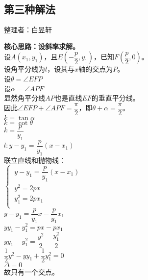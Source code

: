 \documentclass[UTF8]{ctexart}
\begin{document}
\subsection{第三种解法}
    \begin{center}
        整理者：白昱轩
    \end{center}
    \begin{multicols}{2}
        \small
        \textbf{核心思路：设斜率求解。}\\[5mm]
        设$A(x_1,y_1)$，且$E\left(-\dfrac{p}{2},y_1\right)$，已知$F\left(\dfrac{p}{2},0\right)$。\\[5mm]
        设角平分线为$l$，设其与$x$轴的交点为$P$。\\[5mm]
        设$\theta=\angle EFP$\\[5mm]
        设$\alpha=\angle APF$\\[5mm]
        显然角平分线$AP$也是直线$EF$的垂直平分线。\\[5mm]
        因此$\angle EFP + \angle APF=\dfrac{\pi}{2}$，即$\theta+\alpha=\dfrac{\pi}{2}$。\\[5mm]
        $k=\tan\alpha$\\[5mm]
        $k=\cot\theta$\\[5mm]
        $k=\dfrac{p}{y_1}$\\[5mm]
        $l:y-y_1=\dfrac{p}{y_1}\left(x-x_1\right)$\\[5mm]
        联立直线和抛物线：\\[5mm]
        \begin{math}
            \begin{cases}
                ~y-y_1 = \dfrac{p}{y_1}\left(x-x_1\right)\\[1mm]
                ~y^2 = 2px\\[1mm]
                ~y_1^2 = 2px_1\\[1mm]
            \end{cases}        
        \end{math}\\[5mm]
        $y-y_1=\dfrac{p}{y_1}x-\dfrac{p}{y_1}x_1$\\[5mm]
        $yy_1-y_1^2=px-px_1$\\[5mm]
        $yy_1-y_1^2=\dfrac{y^2}{2}-\dfrac{y_1^2}{2}$\\[5mm]
        $\dfrac{1}{2}y^2-yy_1 + \dfrac{1}{2}y_1^2 = 0$\\[5mm]
        $\Delta = 0$\\[5mm]
        故只有一个交点。
        \newpage
    \end{multicols}   
\end{document}
